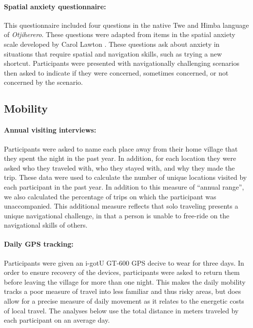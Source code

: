 \paragraph{Spatial anxiety questionnaire:}  This questionnaire included four questions in the native Twe and Himba language of \emph{Otjiherero}.  These questions were adapted from items in the spatial anxiety scale developed by Carol Lawton \citep{lawton1994gender}.  These questions ask about anxiety in situations that require spatial and navigation skills, such as trying a new shortcut. Participants were presented with navigationally challenging scenarios then asked to indicate if they were concerned, sometimes concerned, or not concerned by the scenario.

	\subsection{Mobility}
	\label{sec:2.2.4}
	
\paragraph{Annual visiting interviews:}  Participants were asked to name each place away from their home village that they spent the night in the past year.  In addition, for each location they were asked who they traveled with, who they stayed with, and why they made the trip.  These data were used to calculate the number of unique locations visited by each participant in the past year.  In addition to this measure of ``annual range'', we also calculated the percentage of trips on which the participant was unaccompanied.  This additional measure reflects that solo traveling presents a unique navigational challenge, in that a person is unable to free-ride on the navigational skills of others.

\paragraph{Daily GPS tracking:}  Participants were given an i-gotU GT-600 GPS decive to wear for three days.  In order to ensure recovery of the devices, participants were asked to return them before leaving the village for more than one night.  This makes the daily mobility tracks a poor measure of travel into less familiar and thus risky areas, but does allow for a precise measure of daily movement as it relates to the energetic costs of local travel.  The analyses below use the total distance in meters traveled by each participant on an average day. 

